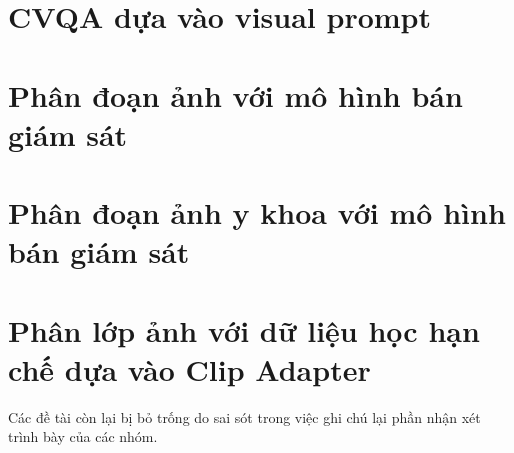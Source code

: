 \section*{CVQA dựa vào visual prompt}

\section*{Phân đoạn ảnh với mô hình bán giám sát}

\section*{Phân đoạn ảnh y khoa với mô hình bán giám sát}

\section*{Phân lớp ảnh với dữ liệu học hạn chế dựa vào Clip Adapter}

Các đề tài còn lại bị bỏ trống do sai sót trong việc ghi chú lại phần nhận xét trình bày của các nhóm.